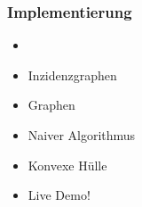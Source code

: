 \begin{frame}
    \frametitle{Implementierung}

    \begin{itemize}
        \item \CCe
        \item Inzidenzgraphen
        \item Graphen
        \item Naiver Algorithmus
        \item Konvexe Hülle
        \item Live Demo!
    \end{itemize}
\end{frame}


